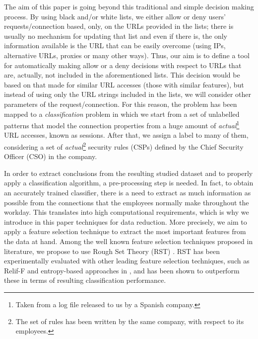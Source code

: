 \documentclass{llncs}
\begin{document}
The aim of this paper is going beyond this traditional and simple
decision making process. By using black and/or white lists, we either
allow or deny users' requests/connection based, only, on the URLs
provided in the lists; there is usually no mechanism for updating that
list and even if there is, the only information available is the URL
that can be easily overcome (using IPs, alternative URLs, proxies or
many other ways). Thus, our aim is to define a tool for automatically
making allow or a deny decisions with respect to URLs that are,
actually, not included in the aforementioned lists. This decision
would be based on that made for similar URL accesses (those with
similar features), but instead of using only the URL strings
included in the lists, we will consider other parameters of
the request/connection. 
For this reason, the problem has been mapped to a
\textit{classification} problem in which we start from a set of
unlabelled patterns that model the connection properties from a huge
amount of \textit{actual}\footnote{Taken from a log file released to
  us by a  Spanish company.} URL accesses, known as sessions. After
that, we assign a label to many of them, considering a set of
\textit{actual}\footnote{The set of rules has been written by the same
  company, with respect to its employees.} security rules (CSPs)
defined by the Chief Security Officer (CSO) in the company. %

In order to extract conclusions from the resulting studied dataset and
to properly apply a classification algorithm, a pre-processing step is
needed. In fact, to obtain an accurately trained classifier, there is
a need to extract as much information as possible from the connections
that the employees normally make throughout the workday. This
translates into high computational requirements, which is why we
introduce in this paper  techniques for data reduction. More precisely, we aim to apply a feature selection technique to extract the most important features from the data at hand. Among the well known feature selection techniques proposed in literature, we propose to use Rough Set Theory (RST) \cite{pawlak2008rough}. RST has been experimentally evaluated with other leading feature selection techniques, such as Relif-F and entropy-based approaches in \cite{jensen2007fuzzy}, and has been shown to outperform these in terms of resulting classification performance.
 
\end{document}
